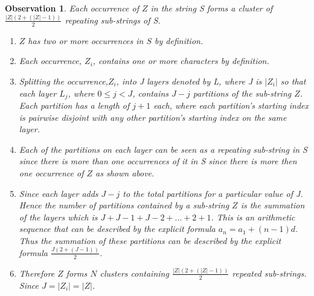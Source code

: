 \documentclass[12pt]{article}
\newtheorem{obser}{Observation}[section]
\begin{document}
\begin{flushleft}
	\begin{obser}
	Each occurrence of $Z$ in the string S forms a cluster of $\frac{|Z|(2 + (|Z|-1))}{2}$ repeating sub-strings of S.
		\begin{enumerate}
			\item $Z$ has two or more occurrences in $S$ by definition.
			\item Each occurrence, $Z_{i}$, contains one or more characters by definition.
			\item Splitting the occurrence,$Z_{i}$, into J layers denoted by L, where J is $|Z_{i}|$ so that each layer $L_{j}$, where $0 \leq j < J $, contains $J - j$ partitions of the sub-string $Z$. Each partition has a length of $j + 1$ each, where each partition's starting index is pairwise disjoint with any other partition's starting index on the same layer.
			\item Each of the partitions on each layer can be seen as a repeating sub-string in S since there is more than one occurrences of it in S since there is more then one occurrence of $Z$ as shown above. 
			\item Since each layer adds $J - j$ to the total partitions for a particular value of J. Hence the number of partitions contained by a sub-string $Z$ is the summation of the layers which is $J + J - 1 + J - 2 + ... + 2 + 1$. This is an arithmetic sequence that can be described by the explicit formula $a_{n} = a_{1} + (n - 1)d$. Thus the summation of these partitions can be described by the explicit formula $\frac{J(2 + (J-1))}{2}$. 
			\item Therefore $Z$ forms $N$ clusters containing $\frac{|Z|(2 + (|Z|-1))}{2}$ repeated sub-strings. Since $J = |Z_{i}| = |Z|$.		      
		\end{enumerate}	
	\end{obser}
	

\end{flushleft}
\end{document}
